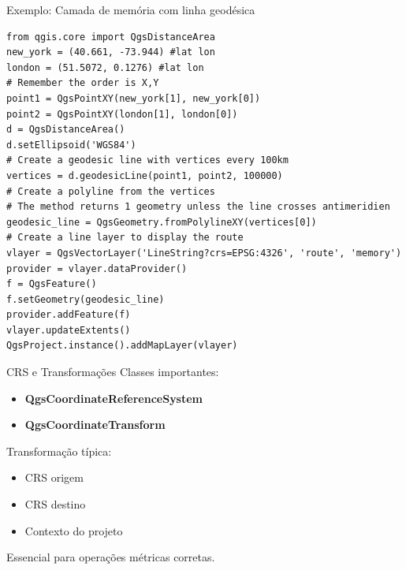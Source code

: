 \documentclass{beamer}
\begin{document}
\begin{frame}[fragile]{Exemplo: Camada de memória com linha geodésica}
    

    
    \begin{verbatim}
from qgis.core import QgsDistanceArea
new_york = (40.661, -73.944) #lat lon
london = (51.5072, 0.1276) #lat lon
# Remember the order is X,Y
point1 = QgsPointXY(new_york[1], new_york[0])
point2 = QgsPointXY(london[1], london[0])
d = QgsDistanceArea()
d.setEllipsoid('WGS84')
# Create a geodesic line with vertices every 100km
vertices = d.geodesicLine(point1, point2, 100000)
# Create a polyline from the vertices
# The method returns 1 geometry unless the line crosses antimeridien
geodesic_line = QgsGeometry.fromPolylineXY(vertices[0])
# Create a line layer to display the route
vlayer = QgsVectorLayer('LineString?crs=EPSG:4326', 'route', 'memory')
provider = vlayer.dataProvider()
f = QgsFeature()
f.setGeometry(geodesic_line)
provider.addFeature(f)
vlayer.updateExtents() 
QgsProject.instance().addMapLayer(vlayer)
    \end{verbatim}
    
\end{frame}

\begin{frame}{CRS e Transformações}
    Classes importantes:
    
    \begin{itemize}
        \item \textbf{QgsCoordinateReferenceSystem}
        \item \textbf{QgsCoordinateTransform}
    \end{itemize}
    
    \vspace{0.4cm}
    
    Transformação típica:
    \begin{itemize}
        \item CRS origem
        \item CRS destino
        \item Contexto do projeto
    \end{itemize}
    
    Essencial para operações métricas corretas.
\end{frame}
\end{document}
